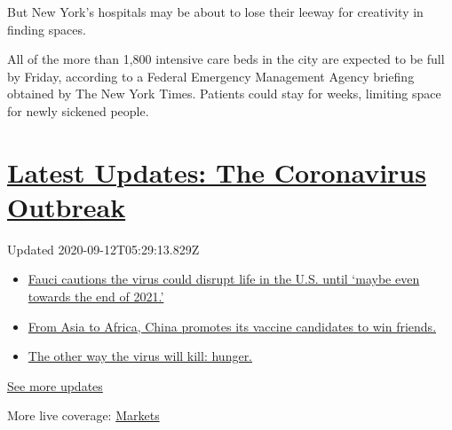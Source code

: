 But New York's hospitals may be about to lose their leeway for
creativity in finding spaces.

All of the more than 1,800 intensive care beds in the city are expected
to be full by Friday, according to a Federal Emergency Management Agency
briefing obtained by The New York Times. Patients could stay for weeks,
limiting space for newly sickened people.

\hypertarget{latest-updates-the-coronavirus-outbreak}{%
\section{\texorpdfstring{\href{https://www.nytimes3xbfgragh.onion/2020/09/11/world/covid-19-coronavirus.html?action=click\&pgtype=Article\&state=default\&region=MAIN_CONTENT_1\&context=storylines_live_updates}{Latest
Updates: The Coronavirus
Outbreak}}{Latest Updates: The Coronavirus Outbreak}}\label{latest-updates-the-coronavirus-outbreak}}

Updated 2020-09-12T05:29:13.829Z

\begin{itemize}
\tightlist
\item
  \href{https://www.nytimes3xbfgragh.onion/2020/09/11/world/covid-19-coronavirus.html?action=click\&pgtype=Article\&state=default\&region=MAIN_CONTENT_1\&context=storylines_live_updates\#link-dfb8a16}{Fauci
  cautions the virus could disrupt life in the U.S. until `maybe even
  towards the end of 2021.'}
\item
  \href{https://www.nytimes3xbfgragh.onion/2020/09/11/world/covid-19-coronavirus.html?action=click\&pgtype=Article\&state=default\&region=MAIN_CONTENT_1\&context=storylines_live_updates\#link-7104d154}{From
  Asia to Africa, China promotes its vaccine candidates to win friends.}
\item
  \href{https://www.nytimes3xbfgragh.onion/2020/09/11/world/covid-19-coronavirus.html?action=click\&pgtype=Article\&state=default\&region=MAIN_CONTENT_1\&context=storylines_live_updates\#link-393ad215}{The
  other way the virus will kill: hunger.}
\end{itemize}

\href{https://www.nytimes3xbfgragh.onion/2020/09/11/world/covid-19-coronavirus.html?action=click\&pgtype=Article\&state=default\&region=MAIN_CONTENT_1\&context=storylines_live_updates}{See
more updates}

More live coverage:
\href{https://www.nytimes3xbfgragh.onion/live/2020/09/11/business/stock-market-today-coronavirus?action=click\&pgtype=Article\&state=default\&region=MAIN_CONTENT_1\&context=storylines_live_updates}{Markets}

